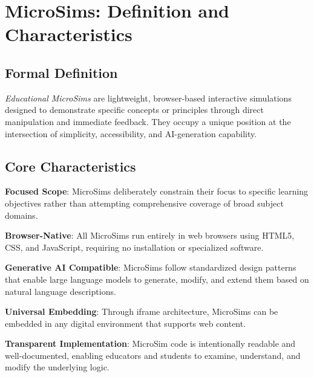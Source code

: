 \section{MicroSims: Definition and Characteristics}
\label{sec:definition}


\subsection{Formal Definition}

\textit{Educational MicroSims} are lightweight, browser-based interactive simulations designed to demonstrate specific concepts or principles through direct manipulation and immediate feedback. They occupy a unique position at the intersection of simplicity, accessibility, and AI-generation capability.

\subsection{Core Characteristics}

\textbf{Focused Scope}: MicroSims deliberately constrain their focus to specific learning objectives rather than attempting comprehensive coverage of broad subject domains.

\textbf{Browser-Native}: All MicroSims run entirely in web browsers using HTML5, CSS, and JavaScript, requiring no installation or specialized software.

\textbf{Generative AI Compatible}: MicroSims follow standardized design patterns that enable large language models to generate, modify, and extend them based on natural language descriptions.

\textbf{Universal Embedding}: Through iframe architecture, MicroSims can be embedded in any digital environment that supports web content.

\textbf{Transparent Implementation}: MicroSim code is intentionally readable and well-documented, enabling educators and students to examine, understand, and modify the underlying logic.

